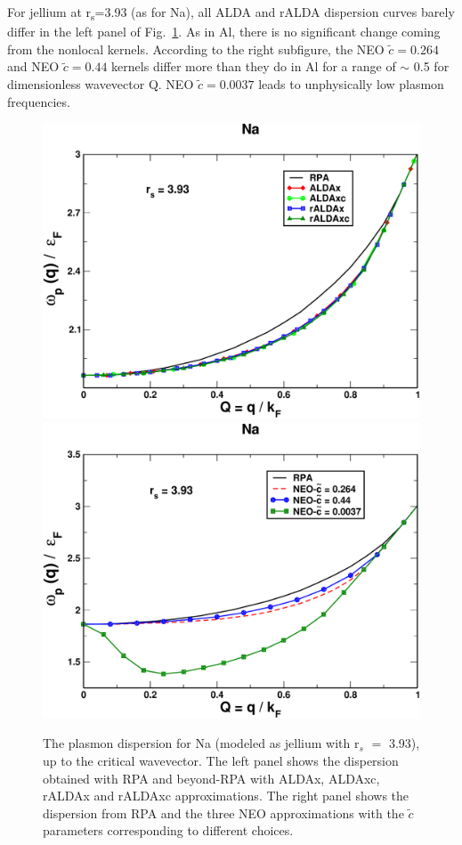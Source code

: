 \documentclass[aps,amsmath,amssymb, preprint, 12pt]{revtex4-1}
\begin{document}


For jellium at r\textsubscript{s}=3.93 (as for Na), all ALDA and rALDA dispersion curves barely differ in the left panel of Fig.~\ref{fig2}. As in Al, there is no significant change coming from the nonlocal kernels. According to the right subfigure, the NEO  \( \widetilde{c}=0.264 \)  and NEO  \( \widetilde{c}=0.44 \)  kernels differ more than they do in Al for a range of $ \sim $ 0.5 for dimensionless wavevector Q. NEO  \( \widetilde{c}=0.0037 \)  leads to unphysically low plasmon frequencies. \\




\begin{figure}[h!]	
	\includegraphics[scale=0.3]{figure_3a.pdf}
	\includegraphics[scale=0.3]{figure_3b.pdf}
	\caption{The plasmon dispersion for Na (modeled as jellium with r$_s$ $=$ 3.93), up to the critical wavevector. The left panel shows the dispersion obtained with RPA and beyond-RPA with ALDAx, ALDAxc, rALDAx and rALDAxc approximations. The right panel shows the dispersion from RPA and the three NEO approximations with the  \( \widetilde{c} \)  parameters corresponding to different choices.}
	\label{fig2}
\end{figure}
\end{document}
